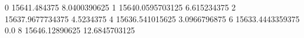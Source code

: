 0 15641.484375 8.0400390625
1 15640.0595703125 6.615234375
2 15637.9677734375 4.5234375
4 15636.541015625 3.0966796875
6 15633.4443359375 0.0
8 15646.12890625 12.6845703125
